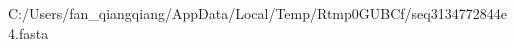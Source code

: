\documentclass[10pt]{article}
\begin{document}
\begin{texshade}{C:/Users/fan_qiangqiang/AppData/Local/Temp/Rtmp0GUBCf/seq3134772844e4.fasta}
\hidelogoscale
{}
\end{texshade}
\end{document}
